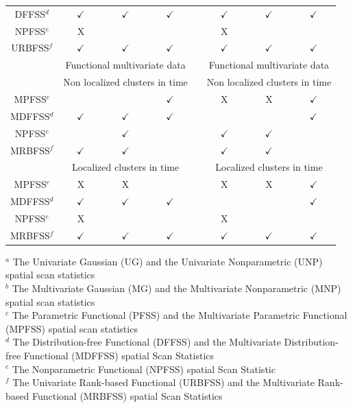 \begin{table}[htbp]
\begin{scriptsize}
\begin{tabular}{cccccccc}
DFFSS$^d$ & $\checkmark$ & $\checkmark$ & $\checkmark$ & &  $\checkmark$ & $\checkmark$ & $\checkmark$ \\
NPFSS$^e$ & \textsf{X} &  & & &  \textsf{X} & & \\
URBFSS$^f$ & $\checkmark$  & $\checkmark$ & $\checkmark$ & &  $\checkmark$ & $\checkmark$ & $\checkmark$ \\
\midrule
\midrule
& \multicolumn{3}{c}{Functional multivariate data} & & \multicolumn{3}{c}{Functional multivariate data}\\
\midrule
& \multicolumn{3}{c}{Non localized clusters in time} & & \multicolumn{3}{c}{Non localized clusters in time} \\
MPFSS$^c$ & &  & $\checkmark$ & &  \textsf{X} & \textsf{X} & $\checkmark$\\
MDFFSS$^d$ & $\checkmark$ & $\checkmark$ & $\checkmark$ & &   &  & $\checkmark$  \\
NPFSS$^e$ & & $\checkmark$ & & &  $\checkmark$ & $\checkmark$ & \\
MRBFSS$^f$ & $\checkmark$ & $\checkmark$ & & &  $\checkmark$ & $\checkmark$ & \\
\midrule
& \multicolumn{3}{c}{Localized clusters in time} & & \multicolumn{3}{c}{Localized clusters in time}\\
MPFSS$^c$ & \textsf{X} & \textsf{X} &  & & \textsf{X} & \textsf{X} & $\checkmark$\\
MDFFSS$^d$ & $\checkmark$ & $\checkmark$ & $\checkmark$ & &   &  & $\checkmark$\\
NPFSS$^e$ & \textsf{X} &  & & &  \textsf{X} & &\\
MRBFSS$^f$ &  $\checkmark$ & $\checkmark$ & $\checkmark$ & & $\checkmark$ & $\checkmark$ & $\checkmark$  \\
\bottomrule
\end{tabular}

$^a$ The Univariate Gaussian (UG) and the Univariate Nonparametric (UNP) spatial scan statistics \\
$^b$ The Multivariate Gaussian (MG) and the Multivariate Nonparametric (MNP) spatial scan statistics \\
$^c$ The Parametric Functional (PFSS) and the Multivariate Parametric Functional (MPFSS) spatial scan statistics \\
$^d$ The Distribution-free Functional (DFFSS) and the Multivariate Distribution-free Functional (MDFFSS) spatial Scan Statistics \\
$^e$ The Nonparametric Functional (NPFSS) spatial Scan Statistic \\
$^f$ The Univariate Rank-based Functional (URBFSS) and the Multivariate Rank-based Functional (MRBFSS) spatial Scan Statistics \\

\label{tab:summary_performances}
\end{scriptsize}
\end{table}

